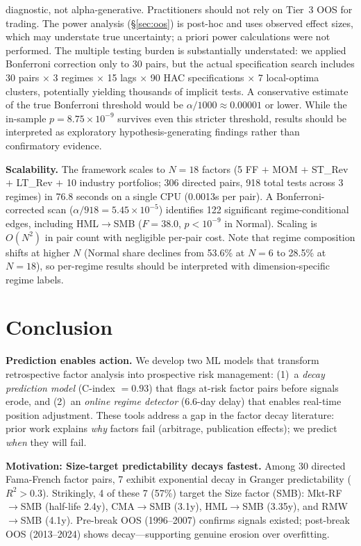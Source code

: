 \documentclass[sigconf,anonymous]{acmart}
\begin{document}
diagnostic, not alpha-generative. Practitioners should not rely on
Tier~3 OOS for trading.
The power analysis (\S\ref{sec:oos}) is post-hoc and uses observed
effect sizes, which may understate true uncertainty; a priori power
calculations were not performed.
The multiple testing burden is substantially understated: we applied
Bonferroni correction only to 30 pairs, but the actual specification
search includes 30 pairs $\times$ 3 regimes $\times$ 15 lags $\times$
90 HAC specifications $\times$ 7 local-optima clusters, potentially
yielding thousands of implicit tests. A conservative estimate of the
true Bonferroni threshold would be $\alpha/1000 \approx 0.00001$ or lower.
While the in-sample $p = 8.75 \times 10^{-9}$ survives even this stricter
threshold, results should be interpreted as exploratory hypothesis-generating
findings rather than confirmatory evidence.

\textbf{Scalability.}
The framework scales to $N = 18$ factors (5 FF $+$ MOM $+$ ST\_Rev
$+$ LT\_Rev $+$ 10 industry portfolios; 306 directed pairs, 918 total
tests across 3 regimes) in 76.8 seconds on a single CPU (0.0013s per
pair). A Bonferroni-corrected scan ($\alpha/918 = 5.45 \times 10^{-5}$)
identifies 122 significant regime-conditional edges, including
HML$\to$SMB ($F = 38.0$, $p < 10^{-9}$ in Normal).
Scaling is $O(N^2)$ in pair count with negligible per-pair cost.
Note that regime composition shifts at higher $N$ (Normal share
declines from 53.6\% at $N{=}6$ to 28.5\% at $N{=}18$), so per-regime
results should be interpreted with dimension-specific regime labels.

\section{Conclusion}

\textbf{Prediction enables action.}
We develop two ML models that transform retrospective factor analysis
into prospective risk management: (1)~a \emph{decay prediction model}
(C-index $= 0.93$) that flags at-risk factor pairs before signals erode,
and (2)~an \emph{online regime detector} (6.6-day delay) that enables
real-time position adjustment. These tools address a gap in the factor
decay literature: prior work explains \emph{why} factors fail (arbitrage,
publication effects); we predict \emph{when} they will fail.

\textbf{Motivation: Size-target predictability decays fastest.}
Among 30 directed Fama-French factor pairs, 7 exhibit exponential decay
in Granger predictability ($R^2 > 0.3$). Strikingly, 4 of these 7 (57\%)
target the Size factor (SMB): Mkt-RF$\to$SMB (half-life 2.4y),
CMA$\to$SMB (3.1y), HML$\to$SMB (3.35y), and RMW$\to$SMB (4.1y).
Pre-break OOS (1996--2007) confirms signals existed; post-break OOS
(2013--2024) shows decay---supporting genuine erosion over overfitting.
\end{document}
